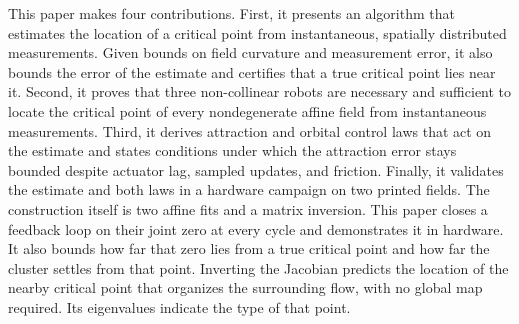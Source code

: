%
This paper makes four contributions. First, it presents an algorithm that estimates the location of a critical point from instantaneous, spatially distributed measurements. Given bounds on field curvature and measurement error, it also bounds the error of the estimate and certifies that a true critical point lies near it. Second, it proves that three non-collinear robots are necessary and sufficient to locate the critical point of every nondegenerate affine field from instantaneous measurements. Third, it derives attraction and orbital control laws that act on the estimate and states conditions under which the attraction error stays bounded despite actuator lag, sampled updates, and friction. Finally, it validates the estimate and both laws in a hardware campaign on two printed fields.
%
The construction itself is two affine fits and a matrix inversion. This paper closes a feedback loop on their joint zero at every cycle and demonstrates it in hardware. It also bounds how far that zero lies from a true critical point and how far the cluster settles from that point.
%
Inverting the Jacobian predicts the location of the nearby critical point that organizes the surrounding flow, with no global map required. Its eigenvalues indicate the type of that point.
